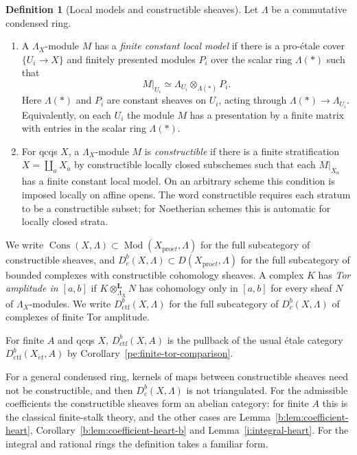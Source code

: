 \documentclass[11pt,a4paper]{article}
\numberwithin{equation}{section}
\theoremstyle{definition}
\newtheorem{definition}[theorem]{Definition}
\theoremstyle{remark}
\newcommand{\Dbc}{D^b_c}
\newcommand{\Mod}{\operatorname{Mod}}
\newcommand{\et}{\acute{e}t}
\newcommand{\proet}{\mathrm{pro}\acute{e}t}
\newcommand{\Cons}{\operatorname{Cons}}
\newcommand{\Dctf}{D^b_{\mathrm{ctf}}}
\begin{document}
\begin{definition}[Local models and constructible sheaves]
\label{n:def-constructible}\label{n:def-field-constructible}
Let $\Lambda$ be a commutative condensed ring.
\begin{enumerate}
\item A $\Lambda_X$-module $M$ has a \emph{finite constant local model}
  if there is a pro-\'etale cover $\{U_i\to X\}$ and finitely presented
  modules $P_i$ over the scalar ring $\Lambda(*)$ such that
  \[
    M|_{U_i}\simeq\Lambda_{U_i}\otimes_{\Lambda(*)}P_i.
  \]
  Here $\Lambda(*)$ and $P_i$ are constant sheaves on $U_i$, acting
  through $\Lambda(*)\to\Lambda_{U_i}$. Equivalently, on each $U_i$ the
  module $M$ has a presentation by a finite matrix with entries in the
  scalar ring $\Lambda(*)$.
\item For qcqs $X$, a $\Lambda_X$-module $M$ is \emph{constructible} if
  there is a finite stratification $X=\coprod_aX_a$ by constructible
  locally closed subschemes such that each $M|_{X_a}$ has a finite
  constant local model. On an arbitrary scheme this condition is
  imposed locally on affine opens. The word constructible requires
  each stratum to be a constructible subset; for Noetherian schemes
  this is automatic for locally closed strata.
\end{enumerate}
We write $\Cons(X,\Lambda)\subset\Mod(X_{\proet},\Lambda)$ for the full
subcategory of constructible sheaves, and $\Dbc(X,\Lambda)\subset
D(X_{\proet},\Lambda)$ for the full subcategory of bounded complexes with
constructible cohomology sheaves. A complex $K$ has \emph{Tor amplitude
in $[a,b]$} if $K\otimes^{\mathbf L}_{\Lambda_X}N$ has cohomology only
in $[a,b]$ for every sheaf $N$ of $\Lambda_X$-modules. We write
$\Dctf(X,\Lambda)$ for the full subcategory of $\Dbc(X,\Lambda)$ of
complexes of finite Tor amplitude.
\label{def:sp-finite-category}\label{def:sp-tor-amplitude}
\end{definition}
For finite $A$ and qcqs $X$, $\Dctf(X,A)$ is the pullback of the usual
\'etale category $\Dctf(X_{\et},A)$ by
Corollary~\ref{pe:finite-tor-comparison}.

For a general condensed ring, kernels of maps between constructible
sheaves need not be constructible, and then $\Dbc(X,\Lambda)$ is not
triangulated. For the admissible coefficients the constructible sheaves form an
abelian category: for finite $A$ this is the classical finite-stalk
theory, and the other cases are Lemma~\ref{b:lem:coefficient-heart},
Corollary~\ref{b:lem:coefficient-heart-b} and Lemma~\ref{i:integral-heart}.
For the integral and rational rings the definition takes a familiar form.
\end{document}
